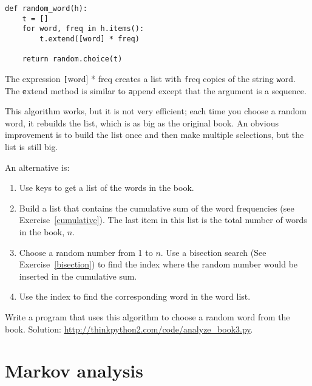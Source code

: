 \documentclass[
DIV=11,
fontsize=12,
twoside,
headinclude=false,
titlepage=firstiscover,
abstract=true,
headsepline=true,
footsepline=true,
chapterprefix=true, %
headings=big,
bibliography=totoc,%
captions=tableheading
]{scrbook}
\theoremstyle{definition}
\begin{document}
\begin{lstlisting}
def random_word(h):
    t = []
    for word, freq in h.items():
        t.extend([word] * freq)

    return random.choice(t)
\end{lstlisting}
%
The expression {\texttt [word] * freq} creates a list with {\texttt freq}
copies of the string {\texttt word}.  The {\texttt extend}
method is similar to {\texttt append} except that the argument is
a sequence.

This algorithm works, but it is not very efficient; each time you
choose a random word, it rebuilds the list, which is as big as
the original book.  An obvious improvement is to build the list
once and then make multiple selections, but the list is still big.

An alternative is:

\begin{enumerate}

\item Use {\texttt keys} to get a list of the words in the book.

\item Build a list that contains the cumulative sum of the word
  frequencies (see Exercise~\ref{cumulative}).  The last item
  in this list is the total number of words in the book, $n$.
  
\item Choose a random number from 1 to $n$.  Use a bisection search
  (See Exercise~\ref{bisection}) to find the index where the random
  number would be inserted in the cumulative sum.

\item Use the index to find the corresponding word in the word list.

\end{enumerate}

\begin{exercise}
\normalfont
\label{randhist}

Write a program that uses this algorithm to choose a random word from
the book.  Solution:
\url{http://thinkpython2.com/code/analyze_book3.py}.

\end{exercise}



\section{Markov analysis}
\label{markov}
\end{document}
